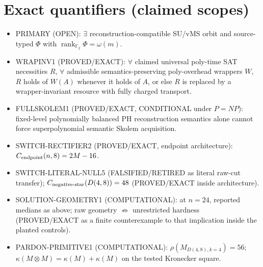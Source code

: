 \documentclass[11pt]{article}
\begin{document}
\section*{Exact quantifiers (claimed scopes)}
\begin{itemize}
\item PRIMARY (OPEN): $\exists$ reconstruction-compatible SU/vMS orbit and source-typed
  $\Phi$ with $\operatorname{rank}_{\mathbb F_2}\Phi=\omega(m)$.
\item WRAPINV1 (PROVED/EXACT): $\forall$ claimed universal poly-time SAT necessities $R$,
  $\forall$ admissible semantics-preserving poly-overhead wrappers $W$, $R$ holds of $W(A)$
  whenever it holds of $A$, or else $R$ is replaced by a wrapper-invariant resource with
  fully charged transport.
\item FULLSKOLEM1 (PROVED/EXACT, CONDITIONAL under $P=NP$): fixed-level polynomially
  balanced PH reconstruction semantics alone cannot force superpolynomial semantic Skolem
  acquisition.
\item SWITCH-RECTIFIER2 (PROVED/EXACT, endpoint architecture):
  $C_{\rm endpoint}(n,8)=2M-16$.
\item SWITCH-LITERAL-NULL5 (FALSIFIED/RETIRED as literal raw-cut transfer);
  $C_{\rm negative\textrm{-}star}(D(4,8))=48$ (PROVED/EXACT inside architecture).
\item SOLUTION-GEOMETRY1 (COMPUTATIONAL): at $n=24$, reported medians as above;
  raw geometry $\not\Rightarrow$ unrestricted hardness (PROVED/EXACT as a finite
  counterexample to that implication inside the planted controls).
\item PARDON-PRIMITIVE1 (COMPUTATIONAL): $\rho(M_{D(4,8),k=4})=56$;
  $\kappa(M\otimes M)=\kappa(M)+\kappa(M)$ on the tested Kronecker square.
\end{itemize}
\end{document}
